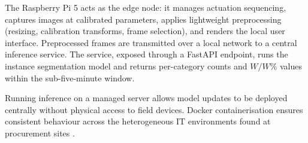 The Raspberry Pi 5 acts as the edge node: it manages actuation sequencing, captures images at calibrated parameters, applies lightweight preprocessing (resizing, calibration transforms, frame selection), and renders the local user interface. Preprocessed frames are transmitted over a local network to a central inference service. The service, exposed through a FastAPI endpoint, runs the instance segmentation model and returns per-category counts and $W/W\%$ values within the sub-five-minute window.

Running inference on a managed server allows model updates to be deployed centrally without physical access to field devices. Docker containerisation ensures consistent behaviour across the heterogeneous IT environments found at procurement sites \cite{Merkel2014}.
